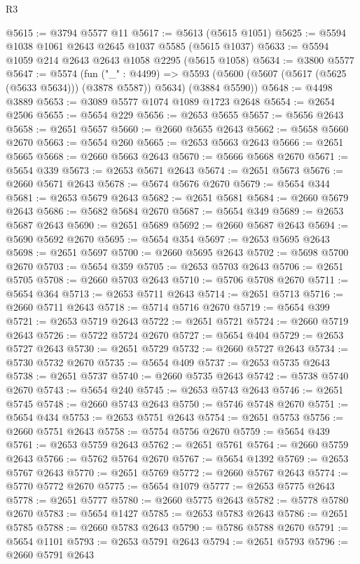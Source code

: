 \begin{lexlean}{R3}
\begin{coremodule}
@5615 := @3794 @5577 @11
@5617 := @5613 (@5615 @1051)
@5625 := @5594 @1038 @1061 @2643 @2645 @1037 @5585 (@5615 @1037)
@5633 := @5594 @1059 @214 @2643 @2643 @1058 @2295 (@5615 @1058)
@5634 := @3800 @5577
@5647 := @5574
    (fun ("_" : @4499) =>
    @5593 (@5600 (@5607 (@5617 (@5625 (@5633 @5634))) (@3878 @5587)) @5634) (@3884 @5590))
@5648 := @4498 @3889
@5653 := @3089 @5577 @1074 @1089 @1723 @2648
@5654 := @2654 @2506
@5655 := @5654 @229
@5656 := @2653 @5655
@5657 := @5656 @2643
@5658 := @2651 @5657
@5660 := @2660 @5655 @2643
@5662 := @5658 @5660 @2670
@5663 := @5654 @260
@5665 := @2653 @5663 @2643
@5666 := @2651 @5665
@5668 := @2660 @5663 @2643
@5670 := @5666 @5668 @2670
@5671 := @5654 @339
@5673 := @2653 @5671 @2643
@5674 := @2651 @5673
@5676 := @2660 @5671 @2643
@5678 := @5674 @5676 @2670
@5679 := @5654 @344
@5681 := @2653 @5679 @2643
@5682 := @2651 @5681
@5684 := @2660 @5679 @2643
@5686 := @5682 @5684 @2670
@5687 := @5654 @349
@5689 := @2653 @5687 @2643
@5690 := @2651 @5689
@5692 := @2660 @5687 @2643
@5694 := @5690 @5692 @2670
@5695 := @5654 @354
@5697 := @2653 @5695 @2643
@5698 := @2651 @5697
@5700 := @2660 @5695 @2643
@5702 := @5698 @5700 @2670
@5703 := @5654 @359
@5705 := @2653 @5703 @2643
@5706 := @2651 @5705
@5708 := @2660 @5703 @2643
@5710 := @5706 @5708 @2670
@5711 := @5654 @364
@5713 := @2653 @5711 @2643
@5714 := @2651 @5713
@5716 := @2660 @5711 @2643
@5718 := @5714 @5716 @2670
@5719 := @5654 @399
@5721 := @2653 @5719 @2643
@5722 := @2651 @5721
@5724 := @2660 @5719 @2643
@5726 := @5722 @5724 @2670
@5727 := @5654 @404
@5729 := @2653 @5727 @2643
@5730 := @2651 @5729
@5732 := @2660 @5727 @2643
@5734 := @5730 @5732 @2670
@5735 := @5654 @409
@5737 := @2653 @5735 @2643
@5738 := @2651 @5737
@5740 := @2660 @5735 @2643
@5742 := @5738 @5740 @2670
@5743 := @5654 @240
@5745 := @2653 @5743 @2643
@5746 := @2651 @5745
@5748 := @2660 @5743 @2643
@5750 := @5746 @5748 @2670
@5751 := @5654 @434
@5753 := @2653 @5751 @2643
@5754 := @2651 @5753
@5756 := @2660 @5751 @2643
@5758 := @5754 @5756 @2670
@5759 := @5654 @439
@5761 := @2653 @5759 @2643
@5762 := @2651 @5761
@5764 := @2660 @5759 @2643
@5766 := @5762 @5764 @2670
@5767 := @5654 @1392
@5769 := @2653 @5767 @2643
@5770 := @2651 @5769
@5772 := @2660 @5767 @2643
@5774 := @5770 @5772 @2670
@5775 := @5654 @1079
@5777 := @2653 @5775 @2643
@5778 := @2651 @5777
@5780 := @2660 @5775 @2643
@5782 := @5778 @5780 @2670
@5783 := @5654 @1427
@5785 := @2653 @5783 @2643
@5786 := @2651 @5785
@5788 := @2660 @5783 @2643
@5790 := @5786 @5788 @2670
@5791 := @5654 @1101
@5793 := @2653 @5791 @2643
@5794 := @2651 @5793
@5796 := @2660 @5791 @2643

\end{coremodule}
\end{lexlean}
